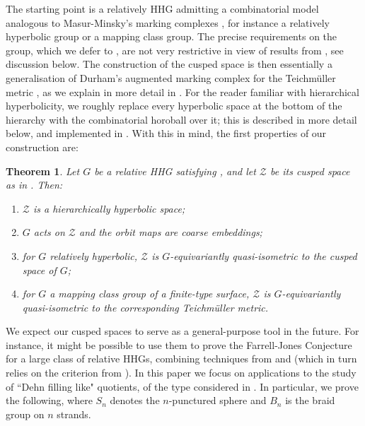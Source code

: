 \documentclass[svgnames]{amsart}
\theoremstyle{plain}
\newtheorem{thmintro}{Theorem}
\theoremstyle{definition}
\begin{document}
 The starting point is a relatively HHG admitting a combinatorial model analogous to Masur-Minsky's marking complexes \cite{Masur_Minsky_2}, for instance a relatively hyperbolic group or a mapping class group. The precise requirements on the group, which we defer to , are not very restrictive in view of results from \cite{converse}, see discussion below. The construction of the cusped space is then essentially a generalisation of Durham's augmented marking complex for the Teichm\"{u}ller metric \cite{Durham_augmented_markings}, as we explain in more detail in . For the reader familiar with hierarchical hyperbolicity, we roughly replace every hyperbolic space at the bottom of the hierarchy with the combinatorial horoball over it; this is described in more detail below, and implemented in . With this in mind, the first properties of our construction are:

\begin{thmintro}
\label{thmintro:first}
    Let $G$ be a relative HHG satisfying , and let $\mathcal Z$ be its cusped space as in . Then:
    \begin{enumerate}
        \item $\mathcal Z$ is a hierarchically hyperbolic space;
        \item $G$ acts on $\mathcal Z$ and the orbit maps are coarse embeddings;
        \item for $G$ relatively hyperbolic, $\mathcal Z$ is $G$-equivariantly quasi-isometric to the cusped space of $G$;
        \item for $G$ a mapping class group of a finite-type surface, $\mathcal Z$ is $G$-equivariantly quasi-isometric to the corresponding Teichm\"{u}ller metric. 
    \end{enumerate}
\end{thmintro}



\noindent  We expect our cusped spaces to serve as a general-purpose tool in the future. For instance, it might be possible to use them to prove the Farrell-Jones Conjecture for a large class of relative HHGs, combining techniques from \cite{relative_FJC} and \cite{durham2025asymptoticallycat0metricszstructures} (which in turn relies on the criterion from \cite{FJC_MCG}). In this paper we focus on applications to the study of ``Dehn filling like" quotients, of the type considered in \cite{dfdt, BHMS,short_HHG:II}. In particular, we prove the following, where $S_n$ denotes the $n$-punctured sphere and $B_n$ is the braid group on $n$ strands.
\end{document}
